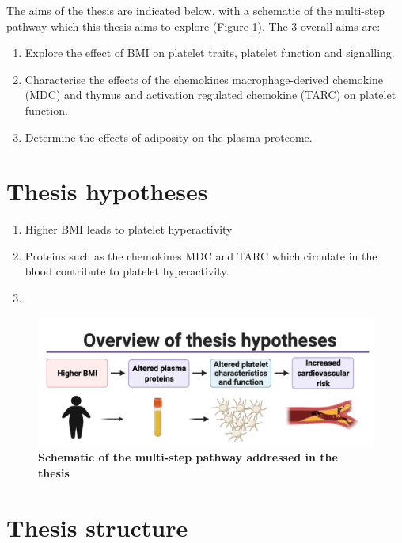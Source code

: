 \documentclass[11pt,twoside]{bristolthesis}
\providecommand{\tightlist}{%
  \setlength{\itemsep}{0pt}\setlength{\parskip}{0pt}}
\begin{document}
The aims of the thesis are indicated below, with a schematic of the multi-step pathway which this thesis aims to explore (Figure \ref{fig:Thesis-schematic}). The 3 overall aims are:
\begin{enumerate}
\def\labelenumi{\arabic{enumi})}
\tightlist
\item
  Explore the effect of BMI on platelet traits, platelet function and signalling.
\item
  Characterise the effects of the chemokines macrophage-derived chemokine (MDC) and thymus and activation regulated chemokine (TARC) on platelet function.
\item
  Determine the effects of adiposity on the plasma proteome.
\end{enumerate}
\hypertarget{thesis-hypotheses}{%
\section{Thesis hypotheses}\label{thesis-hypotheses}}
\begin{enumerate}
\def\labelenumi{\arabic{enumi})}
\tightlist
\item
  Higher BMI leads to platelet hyperactivity
\item
  Proteins such as the chemokines MDC and TARC which circulate in the blood contribute to platelet hyperactivity.
\item
\end{enumerate}


\begin{figure}
\includegraphics{figure/Intro_background/Thesis_graphic_overview_without_chapters} \caption[Schematic of the multi-step pathway addressed in the thesis]{\textbf{Schematic of the multi-step pathway addressed in the thesis}}\label{fig:Thesis-schematic}
\end{figure}
\hypertarget{thesis-structure}{%
\section{Thesis structure}\label{thesis-structure}}
\end{document}
